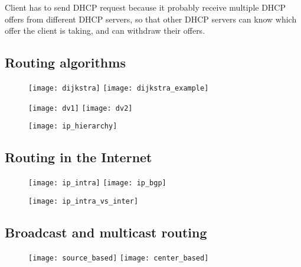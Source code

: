 Client has to send DHCP request because it probably receive multiple DHCP offers
from different DHCP servers, so that other DHCP servers can know which offer the
client is taking, and can withdraw their offers.

\subsection{Routing algorithms}

\begin{figure}[H]
  \centering
  \texttt{[image: dijkstra]}
  \texttt{[image: dijkstra\_example]}
\end{figure}

\begin{figure}[H]
  \centering
  \texttt{[image: dv1]}
  \texttt{[image: dv2]}
\end{figure}



\begin{figure}[H]
  \centering
  \texttt{[image: ip\_hierarchy]}
\end{figure}

\subsection{Routing in the Internet}

\begin{figure}[H]
  \centering
  \texttt{[image: ip\_intra]}
  \texttt{[image: ip\_bgp]}
\end{figure}

\begin{figure}[H]
  \centering
  \texttt{[image: ip\_intra\_vs\_inter]}
\end{figure}

\subsection{Broadcast and multicast routing}

\begin{figure}[H]
  \centering
  \texttt{[image: source\_based]}
  \texttt{[image: center\_based]}
\end{figure}
